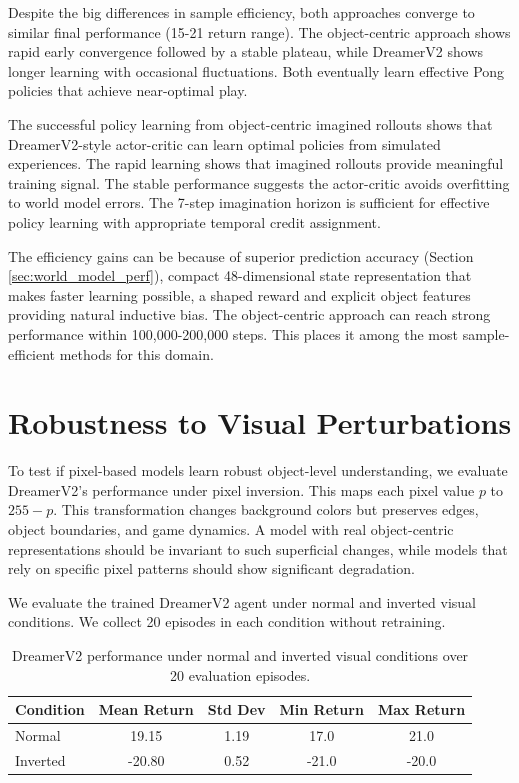 \documentclass[
	english,
	ruledheaders=section,
	class=report,
	thesis={type=master},
	accentcolor=9c,
	custommargins=true,
	marginpar=false,
	parskip=half-,
	fontsize=11pt,
	pdfa=true,
]{tudapub}
\newcommand{\worldmodel}{world model}
\begin{document}
Despite the big differences in sample efficiency, both approaches converge to
similar final performance (15-21 return range). The object-centric approach
shows rapid early convergence followed by a stable plateau, while DreamerV2
shows longer learning with occasional fluctuations. Both eventually learn
effective Pong policies that achieve near-optimal play.

The successful policy learning from object-centric imagined rollouts shows that
DreamerV2-style actor-critic can learn optimal policies from simulated
experiences. The rapid learning shows that imagined rollouts provide meaningful
training signal. The stable performance suggests the actor-critic avoids
overfitting to \worldmodel{} errors. The 7-step imagination horizon is
sufficient for effective policy learning with appropriate temporal credit
assignment.

The efficiency gains can be because of superior prediction accuracy (Section
\ref{sec:world_model_perf}), compact 48-dimensional state representation that
makes faster learning possible, a shaped reward and explicit object features providing natural
inductive bias. The object-centric approach can reach strong performance within
100,000-200,000 steps. This places it among the most sample-efficient methods
for this domain.

\section{Robustness to Visual Perturbations}
\label{sec:robustness}

To test if pixel-based models learn robust object-level understanding, we
evaluate DreamerV2's performance under pixel inversion. This maps each pixel
value $p$ to $255 - p$. This transformation changes background colors but
preserves edges, object boundaries, and game dynamics. A model with real
object-centric representations should be invariant to such superficial changes,
while models that rely on specific pixel patterns should show significant
degradation.

We evaluate the trained DreamerV2 agent under normal and inverted visual
conditions. We collect 20 episodes in each condition without retraining.

\begin{table}[ht]
	\centering
	\caption[DreamerV2 performance under visual perturbations]{DreamerV2 performance under normal and inverted visual conditions over 20 evaluation episodes.}
	\label{tab:robustness_results}
	\begin{tabular}{lcccc}
		\toprule
		Condition & Mean Return & Std Dev & Min Return & Max Return \\
		\midrule
		Normal    & 19.15       & 1.19    & 17.0       & 21.0       \\
		Inverted  & -20.80      & 0.52    & -21.0      & -20.0      \\
		\bottomrule
	\end{tabular}
\end{table}
\end{document}
